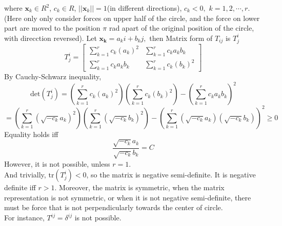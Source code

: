 \documentclass{article}
\begin{document}
\begin{enumerate}
where $\mathbf{x}_k \in R^2$, $c_k\in R$, $||\mathbf{x}_k||=1$(in different directions), $c_k < 0,$ $k = 1,2, \cdots, r.$ \\
(Here only only consider forces on upper half of the circle, and the force on lower part are moved to the position $\pi$ rad apart of the original position of the circle, with direcction reversed). 
Let $\mathbf{x_k} = a_ki + b_kj, $ then
Matrix form of $T_{ij}$ is $T_j ^ i$
\[T_j ^ i = \left[ \begin{array}{cc}
\sum_{k=1} ^ r c_k (a_k)^2 & \sum_{k=1} ^ r c_k a_kb_k  \\
\sum_{k=1} ^ r c_k a_kb_k & \sum_{k=1} ^ r c_k (b_k)^2
\end{array}\right] \]
By Cauchy-Schwarz inequality, 
\[\mathrm{det}(T_j^i) = \left(\sum_{k=1} ^ r c_k (a_k)^2\right)\left(\sum_{k=1} ^ r c_k (b_k)^2\right) - \left(\sum_{k=1} ^ r c_k a_kb_k\right)^2\]
\[ = \left(\sum_{k=1} ^ r (\sqrt{-c_k}a_k)^2\right)\left(\sum_{k=1} ^ r (\sqrt{-c_k}b_k)^2\right) - \left(\sum_{k=1} ^ r (\sqrt{-c_k}a_k)(\sqrt{-c_k}b_k)\right)^2 \geq 0\]
Equality holds iff 
\[\frac{\sqrt{-c_k}a_k}{\sqrt{-c_k}b_k} = C\]
However, it is not possible, unless $r=1$. \\
And trivially, $\mathrm{tr}(T_j^i) <0$, so the matrix is negative semi-definite.
It is negative definite iff $r>1$. Moreover, the matrix is symmetric, when the matrix representation is not symmetric, or when it is not negative semi-definite, there must be force that is not perpendicularly towards the center of circle.\\
For instance, $T^{ij} = \delta ^{ij}$ is not possible.
\end{enumerate}
\end{document}
